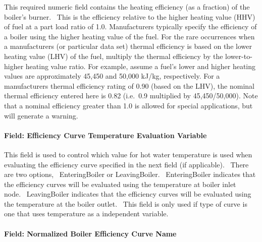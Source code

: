This required numeric field contains the heating efficiency (as a fraction) of the boiler's burner.~ This is the efficiency relative to the higher heating value (HHV) of fuel at a part load ratio of 1.0. Manufacturers typically specify the efficiency of a boiler using the higher heating value of the fuel. For the rare occurrences when a manufacturers (or particular data set) thermal efficiency is based on the lower heating value (LHV) of the fuel, multiply the thermal efficiency by the lower-to-higher heating value ratio. For example, assume a fuel's lower and higher heating values are approximately 45,450 and 50,000 kJ/kg, respectively. For a manufacturers thermal efficiency rating of 0.90 (based on the LHV), the nominal thermal efficiency entered here is 0.82 (i.e.~0.9 multiplied by 45,450/50,000). Note that a nominal efficiency greater than 1.0 is allowed for special applications, but will generate a warning.

\paragraph{Field: Efficiency Curve Temperature Evaluation Variable}\label{field-efficiency-curve-temperature-evaluation-variable}

This field is used to control which value for hot water temperature is used when evaluating the efficiency curve specified in the next field (if applicable).~ There are two options,~ EnteringBoiler or LeavingBoiler.~ EnteringBoiler indicates that the efficiency curves will be evaluated using the temperature at boiler inlet node.~ LeavingBoiler indicates that the efficiency curves will be evaluated using the temperature at the boiler outlet.~ This field is only used if type of curve is one that uses temperature as a independent variable.

\paragraph{Field: Normalized Boiler Efficiency Curve Name}\label{field-normalized-boiler-efficiency-curve-name}

